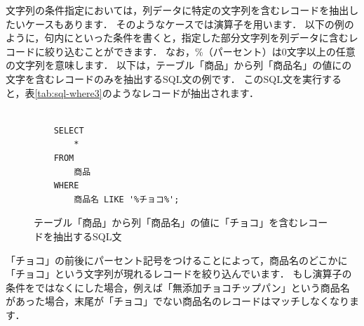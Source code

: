文字列の条件指定においては，列データに特定の文字列を含むレコードを抽出したいケースもあります．
そのようなケースでは演算子を用います．
以下の例のように，句内にといった条件を書くと，指定した部分文字列を列データに含むレコードに絞り込むことができます．
なお，\%（パーセント）は0文字以上の任意の文字列を意味します．
以下は，テーブル「商品」から列「商品名」の値にの文字を含むレコードのみを抽出するSQL文の例です．
このSQL文を実行すると，表\ref{tab:sql-where3}のようなレコードが抽出されます．
\begin{figure}[!htbp]
    \begin{verbatim}

    SELECT
        *
    FROM
        商品
    WHERE
        商品名 LIKE '%チョコ%';

    \end{verbatim}
    \captionsetup{name=コード}
    \caption{テーブル「商品」から列「商品名」の値に「チョコ」を含むレコードを抽出するSQL文}
    \label{code:sql-where3}
\end{figure}
\begin{table}[!htbp]
    \centering
    \caption{テーブル「商品」から列「商品名」の値に「チョコ」を含むレコードを抽出した結果}
    \label{tab:sql-where3}
\end{table}
「チョコ」の前後にパーセント記号をつけることによって，商品名のどこかに「チョコ」という文字列が現れるレコードを絞り込んでいます．
もし演算子の条件をではなくにした場合，例えば「無添加チョコチップパン」という商品名があった場合，末尾が「チョコ」でない商品名のレコードはマッチしなくなります．


